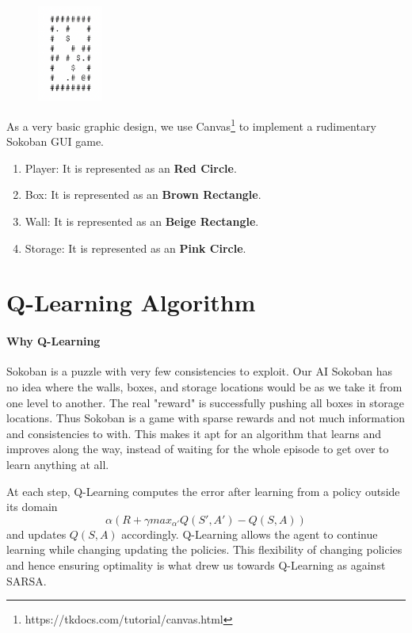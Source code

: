 \documentclass{article}
\begin{document}
{
\begin{figure} %
    \centering
    \includegraphics[width=0.19\textwidth]{board.png}
\end{figure}

As a very basic graphic design, we use Canvas\footnote{https://tkdocs.com/tutorial/canvas.html} to implement a rudimentary Sokoban GUI game. 

\begin{enumerate}[label=\alph*)]
    \item Player: It is represented as an \textbf{Red Circle}.
    \item Box: It is represented as an \textbf{Brown Rectangle}.
    \item Wall: It is represented as an \textbf{Beige Rectangle}.
    \item Storage: It is represented as an \textbf{Pink Circle}.
\end{enumerate}
}

\section{Q-Learning Algorithm}

\paragraph{Why Q-Learning}
Sokoban is a puzzle with very few consistencies to exploit. Our AI Sokoban has no idea where the walls, boxes, and storage locations would be as we take it from one level to another. The real "reward" is successfully pushing all boxes in storage locations. Thus Sokoban is a game with sparse rewards and not much information and consistencies to with. This makes it apt for an algorithm that learns and improves along the way, instead of waiting for the whole episode to get over to learn anything at all.

At each step, Q-Learning computes the error after learning from a policy outside its domain $$\alpha(R + \gamma max_{\alpha'}Q(S',A') - Q(S,A))$$ 
and updates $Q(S,A)$ accordingly. Q-Learning allows the agent to continue learning while changing updating the policies. This flexibility of changing policies and hence ensuring optimality is what drew us towards Q-Learning as against SARSA. 
\end{document}
